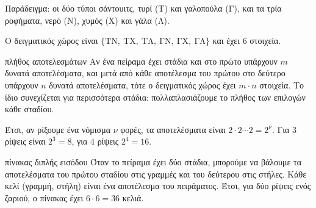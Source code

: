 Παράδειγμα: οι δύο τύποι σάντουιτς, τυρί (Τ) και γαλοπούλα (Γ), και τα τρία ροφήματα, νερό (Ν), χυμός (Χ) και γάλα (Λ).

\begin{center}
\end{center}

Ο δειγματικός χώρος είναι $\{\mathrm{ΤΝ},\ \mathrm{ΤΧ},\ \mathrm{ΤΛ},\ \mathrm{ΓΝ},\ \mathrm{ΓΧ},\ \mathrm{ΓΛ}\}$ και έχει $6$ στοιχεία.

\begin{kanonas}{πλήθος αποτελεσμάτων}
Αν ένα πείραμα έχει στάδια και στο πρώτο υπάρχουν $m$ δυνατά αποτελέσματα, και μετά από κάθε αποτέλεσμα του πρώτου στο δεύτερο υπάρχουν $n$ δυνατά αποτελέσματα, τότε ο δειγματικός χώρος έχει $m\cdot n$ στοιχεία. Το ίδιο συνεχίζεται για περισσότερα στάδια: πολλαπλασιάζουμε το πλήθος των επιλογών κάθε σταδίου.
\end{kanonas}

Έτσι, αν ρίξουμε ένα νόμισμα $\nu$ φορές, τα αποτελέσματα είναι $2\cdot2\cdots2=2^\nu$. Για $3$ ρίψεις είναι $2^3=8$, για $4$ ρίψεις $2^4=16$.

\begin{kanonas}{πίνακας διπλής εισόδου}
Όταν το πείραμα έχει δύο στάδια, μπορούμε να βάλουμε τα αποτελέσματα του πρώτου σταδίου στις γραμμές και του δεύτερου στις στήλες. Κάθε κελί (γραμμή, στήλη) είναι ένα αποτέλεσμα του πειράματος. Έτσι, για δύο ρίψεις ενός ζαριού, ο πίνακας έχει $6\cdot6=36$ κελιά.
\end{kanonas}

